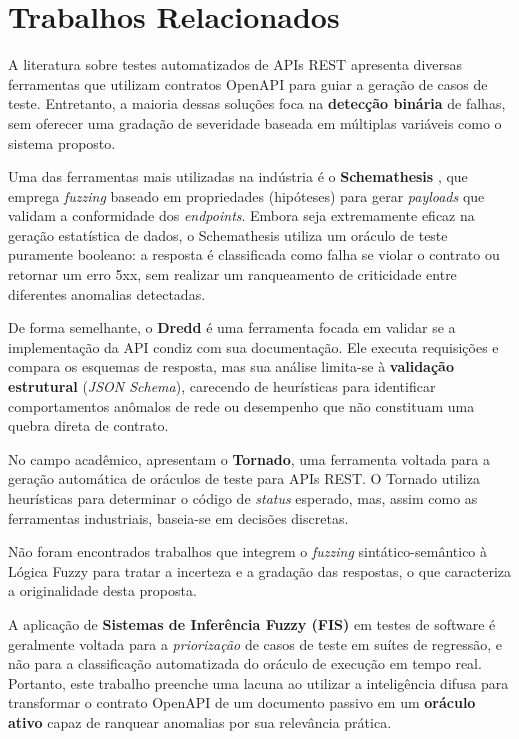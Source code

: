 \section{Trabalhos Relacionados}

A literatura sobre testes automatizados de APIs REST apresenta diversas ferramentas que utilizam contratos OpenAPI para guiar a geração de casos de teste. Entretanto, a maioria dessas soluções foca na \textbf{detecção binária} de falhas, sem oferecer uma gradação de severidade baseada em múltiplas variáveis como o sistema proposto.

Uma das ferramentas mais utilizadas na indústria é o \textbf{Schemathesis} \cite{schemathesis}, que emprega \textit{fuzzing} baseado em propriedades (hipóteses) para gerar \textit{payloads} que validam a conformidade dos \textit{endpoints}. Embora seja extremamente eficaz na geração estatística de dados, o Schemathesis utiliza um oráculo de teste puramente booleano: a resposta é classificada como falha se violar o contrato ou retornar um erro 5xx, sem realizar um ranqueamento de criticidade entre diferentes anomalias detectadas.

De forma semelhante, o \textbf{Dredd} é uma ferramenta focada em validar se a implementação da API condiz com sua documentação. Ele executa requisições e compara os esquemas de resposta, mas sua análise limita-se à \textbf{validação estrutural} (\textit{JSON Schema}), carecendo de heurísticas para identificar comportamentos anômalos de rede ou desempenho que não constituam uma quebra direta de contrato.

No campo acadêmico, \cite{arcuri2026rest} apresentam o \textbf{Tornado}, uma ferramenta voltada para a geração automática de oráculos de teste para APIs REST. O Tornado utiliza heurísticas para determinar o código de \textit{status} esperado, mas, assim como as ferramentas industriais, baseia-se em decisões discretas.

Não foram encontrados trabalhos que integrem o \textit{fuzzing} sintático-semântico à Lógica Fuzzy para tratar a incerteza e a gradação das respostas, o que caracteriza a originalidade desta proposta.

A aplicação de \textbf{Sistemas de Inferência Fuzzy (FIS)} em testes de software é geralmente voltada para a \textit{priorização} de casos de teste em suítes de regressão, e não para a classificação automatizada do oráculo de execução em tempo real. Portanto, este trabalho preenche uma lacuna ao utilizar a inteligência difusa para transformar o contrato OpenAPI de um documento passivo em um \textbf{oráculo ativo} capaz de ranquear anomalias por sua relevância prática.